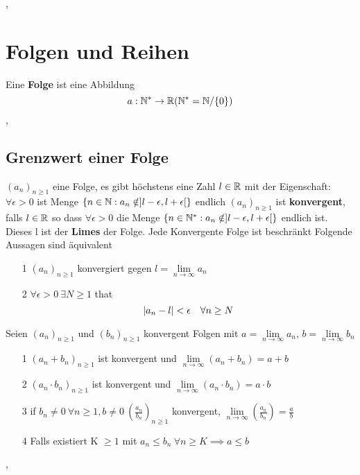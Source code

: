 \sep
\section{Folgen und Reihen}
\Def[2.1] Eine \textbf{Folge} ist eine Abbildung 
\[a: \mathbb{N}^* \rightarrow \mathbb{R} (\mathbb{N}^* = \mathbb{N} / \{0\})\]
\sep
\subsection{Grenzwert einer Folge}
\Lemma[2.3]\((a_n)_{n\geq1}\) eine Folge, es gibt höchstens eine Zahl \(l \in \mathbb{R}\) mit der Eigenschaft: \newline
\(\forall \epsilon > 0\) ist Menge \(\{n \in \mathbb{N} : a_n \notin ]l-\epsilon, l+\epsilon [\}\) endlich
\Def[2.4] \((a_n)_{n\geq1}\) ist \textbf{konvergent}, falls \(l \in \mathbb{R}\) so dass \(\forall \epsilon > 0\)
die Menge \(\{n \in \mathbb{N}^* : a_n \notin ]l-\epsilon, l+\epsilon [\}\) endlich ist. Dieses l ist der \textbf{Limes} der Folge. \newline
\Bem[2.5] Jede Konvergente Folge ist beschränkt
\Lemma[2.6] Folgende Aussagen sind äquivalent
\begin{enumerate}
    \item [1]  \((a_n)_{n\geq1}\) konvergiert gegen \(l = \lim\limits_{n \rightarrow \infty} a_n\)
    \item [2] \(\forall \epsilon > 0 \ \exists N \geq 1\) that
    \[ \left\lvert a_n - l \right\rvert < \epsilon \quad \forall n \geq N \]
\end{enumerate}
\Satz[2.8] Seien \((a_n)_{n \geq 1}\) und \((b_n)_{n \geq 1}\) konvergent Folgen mit \(a= \lim\limits_{n \rightarrow \infty} a_n\), $b = \lim\limits_{n \rightarrow \infty} b_n$
\begin{enumerate} 
    \item [1] \((a_n + b_n)_{n \geq 1}\) ist konvergent und \newline \(\lim\limits_{n \rightarrow \infty} (a_n + b_n) = a+b\)
    \item [2] \((a_n \cdot b_n)_{n \geq 1}\) ist konvergent und \newline \(\lim\limits_{n \rightarrow \infty} (a_n \cdot b_n) = a \cdot b\)
    \item [3] if \(b_n \neq 0 \ \forall n \geq 1, b \neq 0 \ (\frac{a_n}{b_n})_{n\geq 1}\) konvergent, \(\lim\limits_{n \rightarrow \infty} (\frac{a_n}{b_n}) = \frac{a}{b}\)
    \item [4] Falls existiert K \(\geq 1\) mit \(a_n \leq b_n \ \forall n \geq K \implies a \leq b\)
\end{enumerate}
\sep
